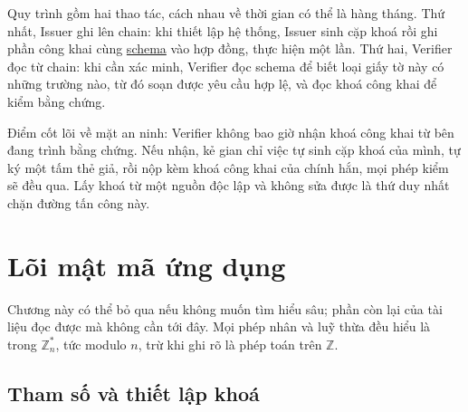 \documentclass[a4paper,11pt,oneside]{report}
\theoremstyle{definition}
\theoremstyle{plain}
\newcommand{\g}[2]{\hyperref[term:#1]{#2}}
\newcommand{\Zn}{\mathbb{Z}_n^{*}}
\begin{document}
\begin{center}
\end{center}

Quy trình gồm hai thao tác, cách nhau về thời gian có thể là hàng tháng. Thứ nhất,
Issuer ghi lên chain: khi thiết lập hệ thống, Issuer sinh cặp khoá rồi ghi phần công
khai cùng \g{schema}{schema} vào hợp đồng, thực hiện một lần. Thứ hai, Verifier đọc
từ chain: khi cần xác minh, Verifier đọc schema để biết loại giấy tờ này có những trường nào, từ
đó soạn được yêu cầu hợp lệ, và đọc khoá công khai để kiểm bằng chứng.

Điểm cốt lõi về mặt an ninh: Verifier không bao giờ nhận khoá công khai từ bên đang trình bằng
chứng. Nếu nhận, kẻ gian chỉ việc tự sinh cặp khoá của mình, tự ký một tấm thẻ giả, rồi nộp kèm
khoá công khai của chính hắn, mọi phép kiểm sẽ đều qua. Lấy khoá từ một nguồn độc lập và không
sửa được là thứ duy nhất chặn đường tấn công này.

\chapter{Lõi mật mã ứng dụng}
\label{ch:crypto}

Chương này có thể bỏ qua nếu không muốn tìm hiểu sâu; phần còn lại của tài liệu đọc được mà không
cần tới đây. Mọi phép nhân và luỹ thừa đều hiểu là trong $\Zn$, tức modulo \g{modulus}{$n$}, trừ
khi ghi rõ là phép toán trên $\mathbb{Z}$.

\section{Tham số và thiết lập khoá}
\label{sec:setup}
\end{document}
